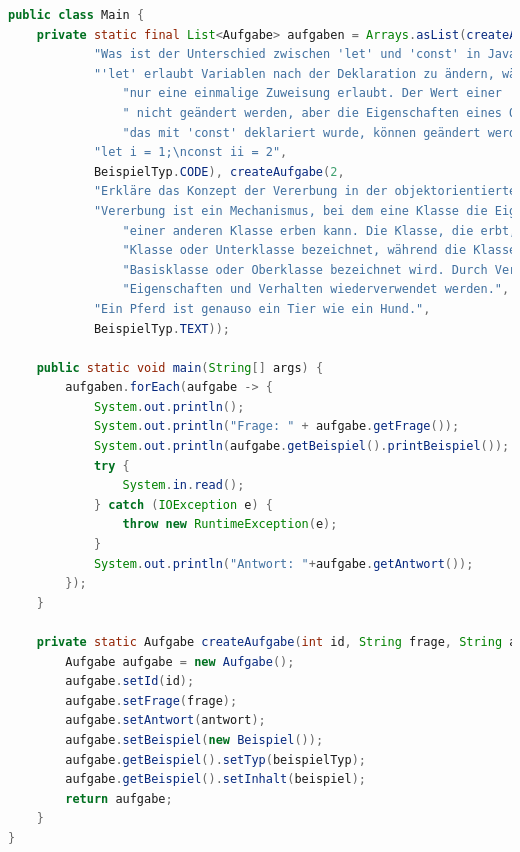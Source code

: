 \documentclass[./einleitung.tex]{subfiles}
\begin{document}
    \begin{lstlisting}[language=Java, caption=Main.java, label=lst:mainJava]
public class Main {
    private static final List<Aufgabe> aufgaben = Arrays.asList(createAufgabe(1,
            "Was ist der Unterschied zwischen 'let' und 'const' in JavaScript?",
            "'let' erlaubt Variablen nach der Deklaration zu ändern, während 'const' " +
                "nur eine einmalige Zuweisung erlaubt. Der Wert einer 'const' Variable kann" +
                " nicht geändert werden, aber die Eigenschaften eines Objekts oder Arrays, " +
                "das mit 'const' deklariert wurde, können geändert werden.",
            "let i = 1;\nconst ii = 2",
            BeispielTyp.CODE), createAufgabe(2,
            "Erkläre das Konzept der Vererbung in der objektorientierten Programmierung.",
            "Vererbung ist ein Mechanismus, bei dem eine Klasse die Eigenschaften und Methoden " +
                "einer anderen Klasse erben kann. Die Klasse, die erbt, wird als abgeleitete " +
                "Klasse oder Unterklasse bezeichnet, während die Klasse, von der geerbt wird, als " +
                "Basisklasse oder Oberklasse bezeichnet wird. Durch Vererbung können gemeinsame " +
                "Eigenschaften und Verhalten wiederverwendet werden.",
            "Ein Pferd ist genauso ein Tier wie ein Hund.",
            BeispielTyp.TEXT));

    public static void main(String[] args) {
        aufgaben.forEach(aufgabe -> {
            System.out.println();
            System.out.println("Frage: " + aufgabe.getFrage());
            System.out.println(aufgabe.getBeispiel().printBeispiel());
            try {
                System.in.read();
            } catch (IOException e) {
                throw new RuntimeException(e);
            }
            System.out.println("Antwort: "+aufgabe.getAntwort());
        });
    }

    private static Aufgabe createAufgabe(int id, String frage, String antwort, String beispiel, BeispielTyp beispielTyp) {
        Aufgabe aufgabe = new Aufgabe();
        aufgabe.setId(id);
        aufgabe.setFrage(frage);
        aufgabe.setAntwort(antwort);
        aufgabe.setBeispiel(new Beispiel());
        aufgabe.getBeispiel().setTyp(beispielTyp);
        aufgabe.getBeispiel().setInhalt(beispiel);
        return aufgabe;
    }
}
    \end{lstlisting}
\end{document}
